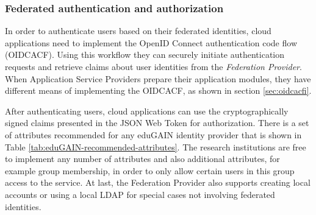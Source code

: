 \documentclass{llncs}
\begin{document}
\subsubsection{Federated authentication and authorization}

In order to authenticate users based on their federated identities, cloud applications need to implement the OpenID Connect authentication code flow (OIDCACF). Using this workflow they can securely initiate authentication requests and retrieve claims about user identities from the \textit{Federation Provider}. When Application Service Providers prepare their application modules, they have different means of implementing the OIDCACF, as shown in section \ref{sec:oidcacfi}.

After authenticating users, cloud applications can use the cryptographically signed claims presented in the JSON Web Token for authorization. There is a set of attributes recommended for any eduGAIN identity provider that is shown in Table \ref{tab:eduGAIN-recommended-attributes}. The research institutions are free to implement any number of attributes and also additional attributes, for example group membership, in order to only allow certain users in this group access to the service. At last, the Federation Provider also supports creating local accounts or using a local LDAP for special cases not involving federated identities.
\end{document}
